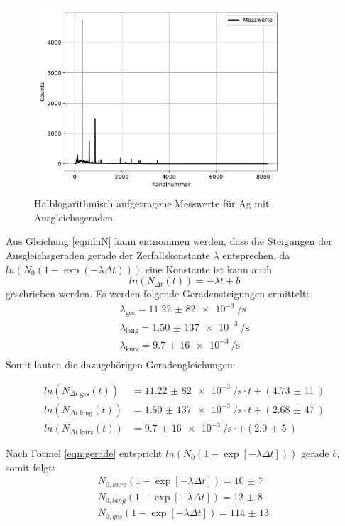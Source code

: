 \begin{figure}[H]
  \centering
  \includegraphics[height=7cm]{plot1.pdf}
  \caption{Halblogarithmisch aufgetragene Messwerte für Ag mit Ausgleichsgeraden.}
  \label{fig:plot1}
\end{figure}

Aus Gleichung \ref{eqn:lnN} kann entnommen werden, dass die Steigungen der Ausgleichsgeraden
gerade der Zerfallskonstante $\lambda$ entsprechen, da $ln(N_0(1-\exp{(-\lambda\Delta t)}))$
eine Konstante ist kann auch
\begin{equation}
  ln(N_{\Delta t}(t))= -\lambda t +b
  \label{eqn:gerade}
\end{equation}
geschrieben werden.
Es werden folgende Geradensteigungen ermittelt:
\begin{align*}
  \lambda_{\text{ges}}=\SI{11,22(82)e-3}{\per\s}\\
  \lambda_{\text{lang}}=\SI{1,50(137)e-3}{\per\s}\\
  \lambda_{\text{kurz}}=\SI{9,7(16)e-3}{\per\s}\\
\end{align*}
Somit lauten die dazugehörigen Geradengleichungen:

\begin{align*}
  ln(N_{\Delta t\;\text{ges}}(t))&=\SI{11,22(82)e-3}{\per\s}\cdot t+(\SI{4,73(11)}{})\\
  ln(N_{\Delta t\;\text{lang}}(t))&=\SI{1,50(137)e-3}{\per\s}\cdot t +(\SI{2,68(47)}{})\\
  ln(N_{\Delta t\;\text{kurz}}(t))&=\SI{9,7(16)e-3}{\per\s}\cdot + (\SI{2,0(5)}{})
\end{align*}

Nach Formel \ref{eqn:gerade} entspricht $ln(N_0(1-\exp{[-\lambda\Delta t]}))$ gerade $b$, somit folgt:
\begin{align*}
  N_{0,kurz}(1-\exp{[-\lambda\Delta t]})=\SI{10(7)}{}\\
  N_{0,lang}(1-\exp{[-\lambda\Delta t]})=\SI{12(8)}{}\\
  N_{0,ges}(1-\exp{[-\lambda\Delta t]})=\SI{114(13)}{}\\
\end{align*}

